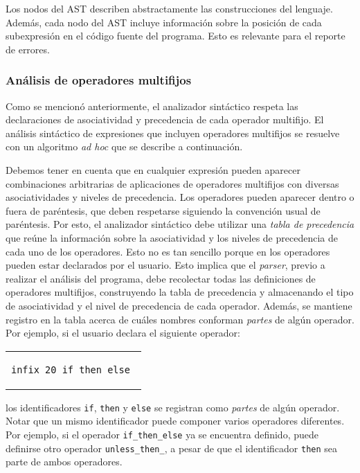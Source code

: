 Los nodos del AST describen abstractamente las construcciones del lenguaje.
Además, cada nodo del AST incluye información sobre la posición de cada subexpresión en el
código fuente del programa. Esto es relevante para el reporte de errores.

\subsubsection{Análisis de operadores multifijos}

Como se mencionó anteriormente, el analizador sintáctico respeta las declaraciones
de asociatividad y precedencia de cada operador multifijo.
El análisis sintáctico de expresiones que incluyen operadores multifijos se
resuelve con un algoritmo {\em ad hoc} que se describe a continuación.

Debemos tener en cuenta que en cualquier expresión pueden aparecer combinaciones arbitrarias
de aplicaciones de operadores multifijos con diversas asociatividades y niveles
de precedencia. Los operadores pueden aparecer dentro o fuera de paréntesis, que deben
respetarse siguiendo la convención usual de paréntesis. Por esto, el analizador sintáctico
debe utilizar una {\em tabla de precedencia} que reúne la información sobre la
asociatividad y los niveles de precedencia de cada uno de los operadores.
Esto no es tan sencillo porque en \nuflo los operadores pueden estar declarados
por el usuario. Esto implica que el {\em parser}, previo a realizar el análisis del programa,
debe recolectar todas las definiciones de operadores multifijos,
construyendo la tabla de precedencia y almacenando el tipo de asociatividad y
el nivel de precedencia de cada operador.
Además, se mantiene registro en la tabla acerca de cuáles nombres
conforman {\em partes} de algún operador.
Por ejemplo, si el usuario declara el siguiente operador:
\begin{center}
\begin{tabular}{l}
\begin{lstlisting}
infix 20 if_then_else_
\end{lstlisting}
\end{tabular}
\end{center}
los identificadores \texttt{if}, \texttt{then} y \texttt{else} se registran
como {\em partes} de algún operador.
Notar que un mismo identificador puede componer varios operadores diferentes.
Por ejemplo, si el operador \texttt{if\_then\_else} ya se encuentra definido,
puede definirse otro operador \texttt{unless\_then\_}, a pesar de que el
identificador \texttt{then} sea parte de ambos operadores.

